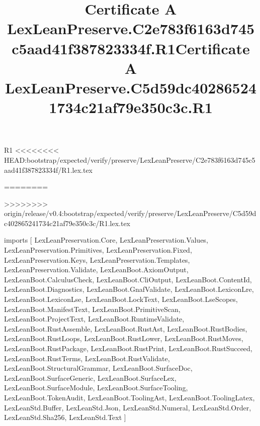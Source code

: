\begin{lexlean}{R1}
<<<<<<<< HEAD:bootstrap/expected/verify/preserve/LexLeanPreserve/C2e783f6163d745c5aad41f387823334f/R1.lex.tex
\title{Certificate A LexLeanPreserve.C2e783f6163d745c5aad41f387823334f.R1}
========
\title{Certificate A LexLeanPreserve.C5d59dc402865241734c21af79e350c3c.R1}
>>>>>>>> origin/release/v0.4:bootstrap/expected/verify/preserve/LexLeanPreserve/C5d59dc402865241734c21af79e350c3c/R1.lex.tex
\begin{coremodule}
imports [
  LexLeanPreservation.Core,
  LexLeanPreservation.Values,
  LexLeanPreservation.Primitives,
  LexLeanPreservation.Fixed,
  LexLeanPreservation.Keys,
  LexLeanPreservation.Templates,
  LexLeanPreservation.Validate,
  LexLeanBoot.AxiomOutput,
  LexLeanBoot.CalculusCheck,
  LexLeanBoot.CliOutput,
  LexLeanBoot.ContentId,
  LexLeanBoot.Diagnostics,
  LexLeanBoot.GnafValidate,
  LexLeanBoot.LexiconLre,
  LexLeanBoot.LexiconLse,
  LexLeanBoot.LockText,
  LexLeanBoot.LseScopes,
  LexLeanBoot.ManifestText,
  LexLeanBoot.PrimitiveScan,
  LexLeanBoot.ProjectText,
  LexLeanBoot.RuntimeValidate,
  LexLeanBoot.RustAssemble,
  LexLeanBoot.RustAst,
  LexLeanBoot.RustBodies,
  LexLeanBoot.RustLoops,
  LexLeanBoot.RustLower,
  LexLeanBoot.RustMoves,
  LexLeanBoot.RustPackage,
  LexLeanBoot.RustPrint,
  LexLeanBoot.RustSucceed,
  LexLeanBoot.RustTerms,
  LexLeanBoot.RustValidate,
  LexLeanBoot.StructuralGrammar,
  LexLeanBoot.SurfaceDoc,
  LexLeanBoot.SurfaceGeneric,
  LexLeanBoot.SurfaceLex,
  LexLeanBoot.SurfaceModule,
  LexLeanBoot.SurfaceTooling,
  LexLeanBoot.TokenAudit,
  LexLeanBoot.ToolingAst,
  LexLeanBoot.ToolingLatex,
  LexLeanStd.Buffer,
  LexLeanStd.Json,
  LexLeanStd.Numeral,
  LexLeanStd.Order,
  LexLeanStd.Sha256,
  LexLeanStd.Text
]


\end{coremodule}
\end{lexlean}
